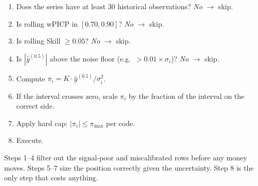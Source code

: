 \begin{enumerate}
  \item Does the series have at least 30 historical observations? \emph{No} $\to$ skip.
  \item Is rolling wPICP in $[0.70, 0.90]$? \emph{No} $\to$ skip.
  \item Is rolling Skill $\geq 0.05$? \emph{No} $\to$ skip.
  \item Is $|\hat{y}^{(0.5)}|$ above the noise floor (e.g.\ $> 0.01 \times \sigma_i$)? \emph{No} $\to$ skip.
  \item Compute $\pi_i = K \cdot \hat{y}^{(0.5)} / \sigma_i^2$.
  \item If the interval crosses zero, scale $\pi_i$ by the fraction of the interval on the correct side.
  \item Apply hard cap: $|\pi_i| \leq \pi_{\max}$ per code.
  \item Execute.
\end{enumerate}

Steps 1--4 filter out the signal-poor and miscalibrated rows before any money moves. Steps 5--7 size the position correctly given the uncertainty. Step 8 is the only step that costs anything.
